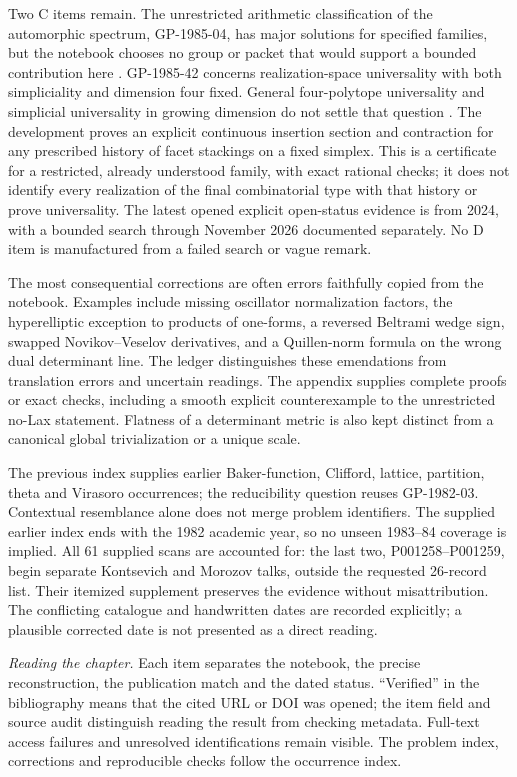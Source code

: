 Two C items remain. The unrestricted arithmetic classification of the
automorphic spectrum, GP-1985-04, has major solutions for specified families,
but the notebook chooses no group or packet that would support a bounded
contribution here \citep[\S4]{arthur2018functoriality}.
GP-1985-42 concerns realization-space universality with both simpliciality and
dimension four fixed. General four-polytope universality and simplicial
universality in growing dimension do not settle that question
\citep[Main Theorem]{richtergebertziegler1995realization}
\citep[Theorem~2 and Conjecture~4]{adiprasitopadrol2017universality}.
The development proves an explicit continuous insertion section and contraction
for any prescribed history of facet stackings on a fixed simplex. This is a
certificate for a restricted, already understood family, with exact rational
checks; it does not identify every realization of the final combinatorial type
with that history or prove universality. The latest opened explicit open-status
evidence is from 2024, with a bounded search through November 2026 documented
separately. No D item is manufactured from a failed search or vague remark.

The most consequential corrections are often errors faithfully copied from the
notebook. Examples include missing oscillator normalization factors, the
hyperelliptic exception to products of one-forms, a reversed Beltrami wedge
sign, swapped Novikov--Veselov derivatives, and a Quillen-norm formula on the
wrong dual determinant line. The ledger distinguishes these emendations from
translation errors and uncertain readings. The appendix supplies complete
proofs or exact checks, including a smooth explicit counterexample to the
unrestricted no-Lax statement. Flatness of a determinant metric is also kept
distinct from a canonical global trivialization or a unique scale.

The previous index supplies earlier Baker-function, Clifford, lattice,
partition, theta and Virasoro occurrences; the reducibility question reuses
GP-1982-03. Contextual resemblance alone does not merge problem identifiers.
The supplied earlier index ends with the 1982 academic year, so no unseen
1983--84 coverage is implied. All 61 supplied scans are accounted for: the
last two, P001258--P001259, begin separate Kontsevich and Morozov talks, outside
the requested 26-record list. Their itemized supplement preserves the evidence
without misattribution. The conflicting catalogue and handwritten dates are
recorded explicitly; a plausible corrected date is not presented as a direct
reading.

\medskip
\noindent\textit{Reading the chapter.} Each item separates the notebook,
the precise reconstruction, the publication match and the dated status.
``Verified'' in the bibliography means that the cited URL or DOI was opened;
the item field and source audit distinguish reading the result from checking
metadata. Full-text access failures and unresolved identifications remain
visible. The problem index, corrections and reproducible checks follow the
occurrence index.
